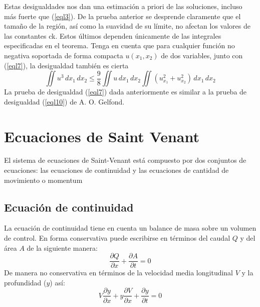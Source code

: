 Estas desigualdades nos dan una estimación a priori de las soluciones, incluso más fuerte que (\ref{eql3}). De la prueba anterior se desprende claramente que el tamaño de la región, así como la suavidad de su límite, no afectan los valores de las constantes ck. Estos últimos dependen únicamente de las integrales especificadas en el teorema.
Tenga en cuenta que para cualquier función no negativa soportada de forma compacta $u(x_1,x_2)$ de dos variables, junto con (\ref{eql7}), la desigualdad también es cierta
\begin{equation}
    \iint u^3\,dx_1\,dx_2 \leq \frac{9}{8} \iint u\,dx_1\,dx_2 \iint \left(u_{x_1}^2 + u_{x_2}^2 \right)\,dx_1\,dx_2
    \label{eql10}
\end{equation}
La prueba de desigualdad (\ref{eql7}) dada anteriormente es similar a la prueba de desigualdad (\ref{eql10}) de A. O. Gelfond.

















































\section{Ecuaciones de Saint Venant}
El sistema de ecuaciones de Saint-Venant está compuesto por dos conjuntos de ecuaciones: las ecuaciones de continuidad y las ecuaciones de cantidad de movimiento o momentum

\subsection{Ecuación de continuidad} %
La ecuación de continuidad tiene en cuenta un balance de masa sobre un volumen de control. En forma conservativa puede escribirse en términos del caudal $Q$ y del área $A$ de la siguiente manera:
\begin{equation}
    \frac{\partial Q}{\partial x} + \frac{\partial A}{\partial t} = 0
\end{equation}
De manera no conservativa en términos de la velocidad media longitudinal $V$ y la profundidad ($y$) así:
\begin{equation}
    V \frac{\partial y}{\partial x} + y \frac{\partial V}{\partial x} + \frac{\partial y}{\partial t} = 0
\end{equation}

